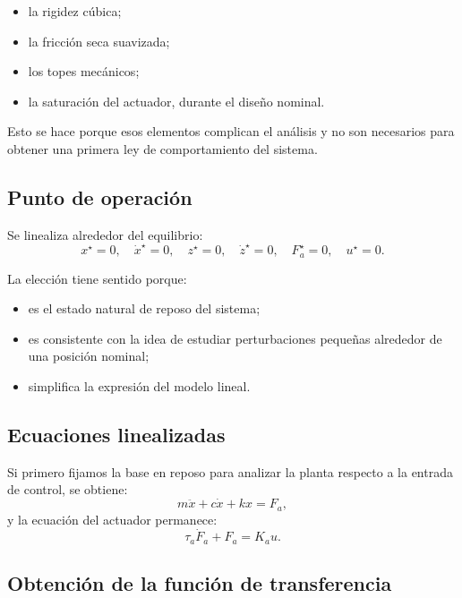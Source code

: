 \documentclass[11pt]{article}
\begin{document}
\begin{itemize}[leftmargin=1.2cm]
\item la rigidez c\'ubica;
\item la fricci\'on seca suavizada;
\item los topes mec\'anicos;
\item la saturaci\'on del actuador, durante el dise\~no nominal.
\end{itemize}

Esto se hace porque esos elementos complican el an\'alisis y no son necesarios para obtener una primera ley de comportamiento del sistema.

\subsection{Punto de operaci\'on}

Se linealiza alrededor del equilibrio:
\[
x^\star = 0,\quad \dot{x}^\star=0,\quad z^\star=0,\quad \dot{z}^\star=0,\quad F_a^\star=0,\quad u^\star=0.
\]

La elecci\'on tiene sentido porque:

\begin{itemize}[leftmargin=1.2cm]
\item es el estado natural de reposo del sistema;
\item es consistente con la idea de estudiar perturbaciones peque\~nas alrededor de una posici\'on nominal;
\item simplifica la expresi\'on del modelo lineal.
\end{itemize}

\subsection{Ecuaciones linealizadas}

Si primero fijamos la base en reposo para analizar la planta respecto a la entrada de control, se obtiene:
\begin{equation}
m\ddot{x} + c\dot{x} + kx = F_a,
\label{eq:lin1}
\end{equation}
y la ecuaci\'on del actuador permanece:
\begin{equation}
\tau_a\dot{F}_a + F_a = K_a u.
\label{eq:lin2}
\end{equation}

\subsection{Obtenci\'on de la funci\'on de transferencia}
\end{document}

